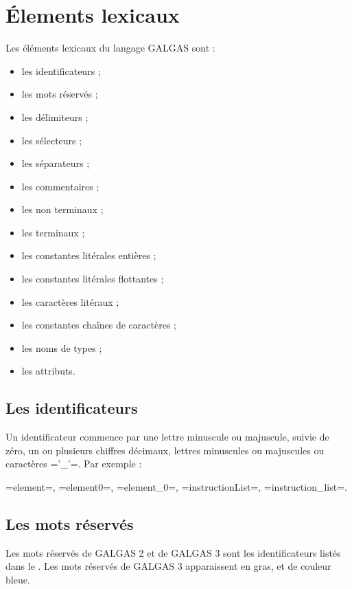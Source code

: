 
\chapter{Élements lexicaux}

Les éléments lexicaux du langage GALGAS sont :
\begin{itemize}
  \item les identificateurs ;
  \item les mots réservés ;
  \item les délimiteurs ;
  \item les sélecteurs ;
  \item les séparateurs ;
  \item les commentaires ;
  \item les non terminaux ;
  \item les terminaux ;
  \item les constantes litérales entières ;
  \item les constantes litérales flottantes ;
  \item les caractères litéraux  ;
  \item les constantes chaînes de caractères ;
  \item les noms de types ;
  \item les attributs.
\end{itemize}


\section{Les identificateurs}

Un identificateur commence par une lettre minuscule ou majuscule, suivie de zéro, un ou plusieurs chiffres décimaux, lettres minuscules ou majuscules ou caractères \ggs='_'=. Par exemple :

\ggs=element=, \ggs=element0=, \ggs=element_0=, \ggs=instructionList=, \ggs=instruction_list=.

\section{Les mots réservés}

Les mots réservés de GALGAS 2 et de GALGAS 3 sont les identificateurs listés dans le . Les mots réservés de GALGAS 3 apparaissent en gras, et de couleur bleue.

